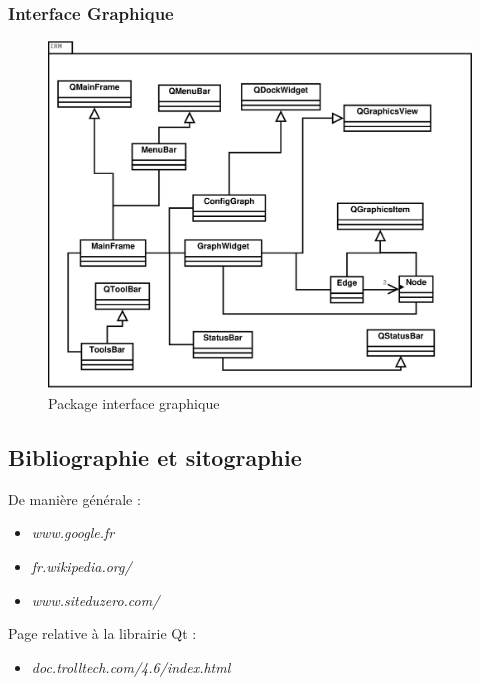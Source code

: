 \documentclass[11pt,a4paper]{article}
\begin{document}
			\subsubsection*{Interface Graphique}
				\begin{figure}[htbp]
					\begin{center}
						\includegraphics[width=0.75\linewidth]{class_ihm.eps}
					\end{center}
					\caption{Package interface graphique}
					\label{img_class_ihm}
				\end{figure}
		
		\newpage
		\subsection{Bibliographie et sitographie}
	
			\noindent De manière générale : \\
			\begin{itemize}
				\item \textit{www.google.fr}\\
				\item \textit{fr.wikipedia.org/}\\
				\item \textit{www.siteduzero.com/}\\
			\end{itemize}
	
			\noindent Page relative à la librairie Qt	:\\
			\begin{itemize}
				\item \textit{doc.trolltech.com/4.6/index.html}\\
			\end{itemize}
	
\end{document}
